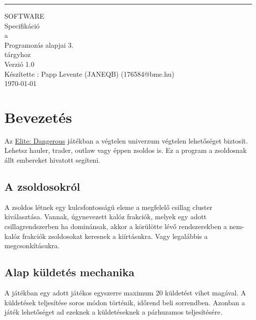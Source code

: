 \documentclass{scrreprt}
\date{}
\def\myversion{1.0 }
\begin{document}
    \begin{flushright}
        \rule{16cm}{5pt}\vskip1cm
        \begin{bfseries}
            \Huge{SOFTWARE\\ Specifikáció}\\
            \vspace{1.5cm}
            a\\
            \vspace{1.5cm}
            Programozás alapjai 3.\\
            \vspace{1.5cm}
            tárgyhoz\\
            \vspace{1.5cm}
            \LARGE{Verzió \myversion}\\
            \vspace{1.5cm}
            Készítette : Papp Levente (JANEQB) (176584@bme.hu)\\

            \vspace{1.5cm}
            \today\\
        \end{bfseries}
    \end{flushright}

    \tableofcontents



    \chapter{Bevezetés}\label{ch:bevezetes}

    Az \href{https://www.elitedangerous.com/}{Elite: Dangerous\texttrademark} játékban a végtelen univerzum végtelen lehetőséget biztosít.
    Lehetsz hauler, trader, outlaw vagy éppen zsoldos is.
    Ez a program a zsoldosnak állt embereket hivatott segíteni.

    \section{A zsoldosokról}\label{sec:a-zsoldosokrol}
    A zsoldos létnek egy kulcsfontosságú eleme a megfelelő csillag cluster kiválasztása.
    Vannak, úgynevezett kalóz frakciók, melyek egy adott csillagrendszerben ha dominánsak, akkor a körülötte lévő rendszerekben a nem-kalóz frakciók zsoldosokat keresnek a kiírtásukra.
    Vagy legalábbis a megcsonkításukra.

    \section{Alap küldetés mechanika}\label{sec:alap-kuldetes-mechanika}
    A játékban egy adott játékos egyszerre maximum 20 küldetést vihet magával.
    A küldetések teljesítése soros módon történik, időrend beli sorrendben.
    Azonban a játék lehetőséget ad ezeknek a küldetéseknek a párhuzamos teljesítésére.
\end{document}
